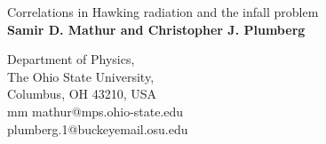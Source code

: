 \documentclass[11pt]{article}
\begin{document}




\makeatletter
{}
\makeatother



%
 \begin{center}
{\LARGE Correlations in Hawking radiation and the infall problem}
\\
\vspace{18mm}
{\bf    Samir D. Mathur
and
Christopher J. Plumberg}
\vspace{8mm}

\vspace{8mm}



Department of Physics,\\ The Ohio State University,\\ Columbus,
OH 43210, USA\\ 
 mm
mathur@mps.ohio-state.edu\\
plumberg.1@buckeyemail.osu.edu
\vspace{10mm}

\end{center}
\end{document}
